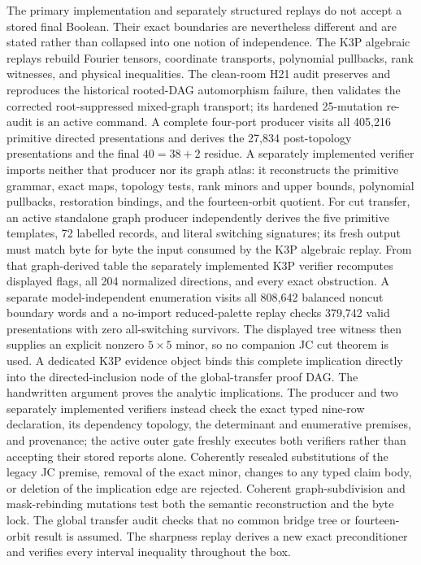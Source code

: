The primary implementation and separately structured replays do not accept a
stored final Boolean.  Their exact boundaries are nevertheless different and
are stated rather than collapsed into one notion of independence.  The K3P
algebraic replays rebuild Fourier tensors, coordinate transports, polynomial
pullbacks, rank witnesses, and physical inequalities.  The clean-room H21
audit preserves and reproduces the historical rooted-DAG automorphism failure,
then validates the corrected root-suppressed mixed-graph transport; its
hardened 25-mutation re-audit is an active command.  A complete four-port
producer visits all 405,216 primitive directed presentations and derives the
27,834 post-topology presentations and the final \(40=38+2\) residue.  A
separately implemented verifier imports neither that producer nor its graph
atlas: it reconstructs the primitive grammar, exact maps, topology tests,
rank minors and upper bounds, polynomial pullbacks, restoration bindings, and
the fourteen-orbit quotient.  For cut transfer, an
active standalone graph producer independently derives the five primitive
templates, 72 labelled records, and literal switching signatures; its fresh
output must match byte for byte the input consumed by the K3P algebraic replay.
From that graph-derived table the separately implemented K3P verifier
recomputes displayed flags, all 204 normalized directions, and every exact
obstruction.  A separate model-independent enumeration visits all 808,642
balanced noncut boundary words and a no-import reduced-palette replay checks
379,742 valid presentations with zero all-switching survivors.  The displayed
tree witness then supplies an explicit nonzero \(5\times5\) minor, so no companion JC
cut theorem is used.  A dedicated K3P evidence object binds this complete
implication directly into the directed-inclusion node of the global-transfer
proof DAG.  The handwritten argument proves the analytic implications.  The
producer and two separately implemented verifiers instead check the exact
typed nine-row declaration, its dependency topology, the determinant and
enumerative premises, and provenance; the active outer gate freshly executes
both verifiers rather than accepting their stored reports alone.  Coherently
resealed substitutions of the legacy JC premise, removal of the exact minor,
changes to any typed claim body, or deletion of the implication edge are
rejected.  Coherent graph-subdivision
and mask-rebinding mutations
test both the semantic reconstruction and the byte lock.  The global transfer audit checks that no
common bridge tree or fourteen-orbit result is assumed.  The sharpness replay
derives a new exact preconditioner and verifies every interval inequality
throughout the box.


